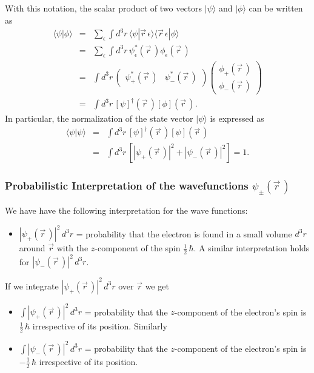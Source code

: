 \ee
With this notation, the scalar product of two vectors $|\psi\rangle$ and $|\phi\rangle$ can be written as
\begin{eqnarray}
\langle \psi|\phi\rangle &=& \sum_{\epsilon}\int d^3r\, \langle\psi|\vec{r}\, \epsilon\rangle\langle\vec{r}\,\epsilon|\phi\rangle \nonumber \\
& = & \sum_{\epsilon}\int d^3r\,\psi_{\epsilon}^*(\vec{r}\,)\phi_{\epsilon}(\vec{r}\,) \nonumber \\
& = & \int d^3r\, \begin{pmatrix}\psi_+^*(\vec{r}\,)&\psi_-^*(\vec{r}\,)\end{pmatrix}
\begin{pmatrix}\phi_+(\vec{r}\,)\\\phi_-(\vec{r}\,)\end{pmatrix} \nonumber \\
&= & \int d^3r\, [\psi]^{\dagger}(\vec{r}\,)	[\phi](\vec{r}\,).
\end{eqnarray}			
In particular, the normalization of the state vector $|\psi\rangle$ is expressed as
\begin{eqnarray}
\langle\psi|\psi\rangle &=& \int d^3r\, [\psi]^{\dagger}(\vec{r}\,)[\psi](\vec{r}\,) \nonumber \\
& = & \int d^3r\, \left[ |\psi_+(\vec{r}\,)|^2 + |\psi_-(\vec{r}\,)|^2\right] =1.
\end{eqnarray}		

\subsubsection{Probabilistic Interpretation of the wavefunctions $\psi_{\pm}(\vec{r}\,)$}
We have have the following interpretation for the wave functions:

\begin{itemize}
	\item 
	$|\psi_+(\vec{r}\,)|^2\, d^3r $ = 
	probability that the electron is found in a small volume $d^3r$ around $\vec{r}$ with the $z$-component of the spin 
	$\frac{1}{2}\,\hbar$. A similar interpretation holds for $|\psi_-(\vec{r}\,)|^2\, d^3r$.
\end{itemize}
If we integrate $|\psi_+(\vec{r}\,)|^2\, d^3r $ over $\vec{r}$ we get
\begin{itemize}
	\item
	$\int |\psi_+(\vec{r}\,)|^2\, d^3r$  =
	probability that the $z$-component of the electron's spin is $\frac{1}{2}\, \hbar$ irrespective of its position. Similarly
	\item
	$\int |\psi_-(\vec{r}\,)|^2\, d^3r$  =
	probability that the $z$-component of the electron's spin is $-\frac{1}{2}\, \hbar$ irrespective of its position. 
\end{itemize}

